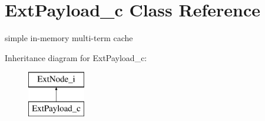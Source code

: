 \hypertarget{classExtPayload__c}{\section{Ext\-Payload\-\_\-c Class Reference}
\label{classExtPayload__c}
}


simple in-\/memory multi-\/term cache  


Inheritance diagram for Ext\-Payload\-\_\-c\-:\begin{figure}[H]
\begin{center}
\leavevmode
\includegraphics[height=2.000000cm]{classExtPayload__c}
\end{center}
\end{figure}

